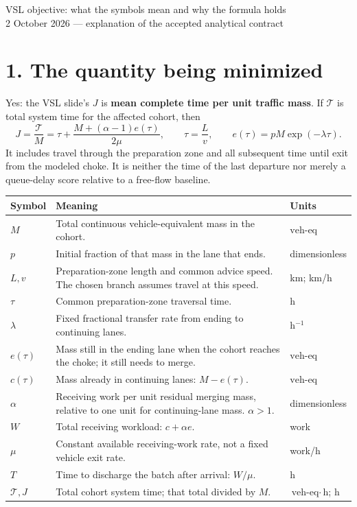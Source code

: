 \documentclass[11pt]{article}
\newcommand{\ve}{\text{veh-eq}}
\begin{document}
\begin{center}
{\Large VSL objective: what the symbols mean and why the formula holds}\\[0.4em]
2 October 2026 --- explanation of the accepted analytical contract
\end{center}

\section*{1. The quantity being minimized}
Yes: the VSL slide's \(J\) is \textbf{mean complete time per unit traffic mass}.
If \(\mathcal T\) is total system time for the affected cohort, then
\[
 J=\frac{\mathcal T}{M}
   =\tau+\frac{M+(\alpha-1)e(\tau)}{2\mu},
 \qquad \tau=\frac{L}{v},\qquad e(\tau)=pM\exp(-\lambda\tau).
\]
It includes travel through the preparation zone and all subsequent time until
exit from the modeled choke. It is neither the time of the last departure nor
merely a queue-delay score relative to a free-flow baseline.

\renewcommand{\arraystretch}{1.22}
\begin{tabular}{@{}p{}p{}p{}@{}}
\toprule
Symbol & Meaning & Units\\
\midrule
\(M\) & Total continuous vehicle-equivalent mass in the cohort. & \(\ve\)\\
\(p\) & Initial fraction of that mass in the lane that ends. & dimensionless\\
\(L,v\) & Preparation-zone length and common advice speed. The chosen branch assumes travel at this speed. & km; km/h\\
\(\tau\) & Common preparation-zone traversal time. & h\\
\(\lambda\) & Fixed fractional transfer rate from ending to continuing lanes. & h\(^{-1}\)\\
\(e(\tau)\) & Mass still in the ending lane when the cohort reaches the choke; it still needs to merge. & \(\ve\)\\
\(c(\tau)\) & Mass already in continuing lanes: \(M-e(\tau)\). & \(\ve\)\\
\(\alpha\) & Receiving work per unit residual merging mass, relative to one unit for continuing-lane mass. \(\alpha>1\). & dimensionless\\
\(W\) & Total receiving workload: \(c+\alpha e\). & work\\
\(\mu\) & Constant available receiving-work rate, not a fixed vehicle exit rate. & work/h\\
\(T\) & Time to discharge the batch after arrival: \(W/\mu\). & h\\
\(\mathcal T,J\) & Total cohort system time; that total divided by \(M\). & \(\ve\cdot\)h; h\\
\bottomrule
\end{tabular}
\end{document}
